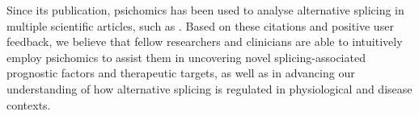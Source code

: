 
Since its publication, psichomics has been used to analyse alternative splicing in multiple scientific articles, such as \cite{coomer:2019wz,baeza-centurion:2019tb,munkley:2019wr,baeza-centurion:2020vb}. Based on these citations and positive user feedback, we believe that fellow researchers and clinicians are able to intuitively employ psichomics to assist them in uncovering novel splicing-associated prognostic factors and therapeutic targets, as well as in advancing our understanding of how alternative splicing is regulated in physiological and disease contexts.
